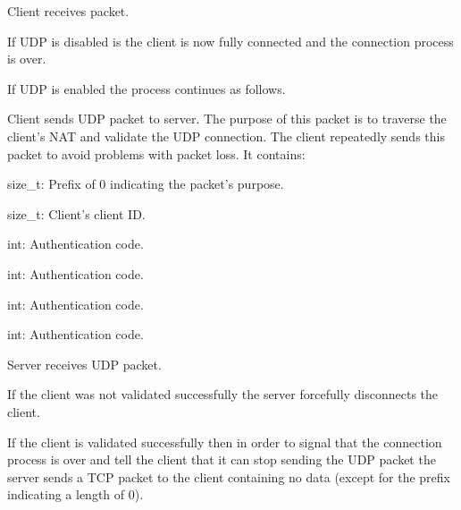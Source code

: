 \begin{DoxyItemize}
\item Client receives packet.
\item If UDP is disabled is the client is now fully connected and the connection process is over.
\item If UDP is enabled the process continues as follows.\par

\end{DoxyItemize}


\begin{DoxyItemize}
\item Client sends UDP packet to server. The purpose of this packet is to traverse the client's NAT and validate the UDP connection. The client repeatedly sends this packet to avoid problems with packet loss. It contains:
\begin{DoxyItemize}
\item size\_\-t: Prefix of 0 indicating the packet's purpose.
\item size\_\-t: Client's client ID.
\item int: Authentication code.
\item int: Authentication code.
\item int: Authentication code.
\item int: Authentication code.\par
\par

\end{DoxyItemize}
\end{DoxyItemize}


\begin{DoxyItemize}
\item Server receives UDP packet.
\item If the client was not validated successfully the server forcefully disconnects the client.
\item If the client is validated successfully then in order to signal that the connection process is over and tell the client that it can stop sending the UDP packet the server sends a TCP packet to the client containing no data (except for the prefix indicating a length of 0).
\end{DoxyItemize}


